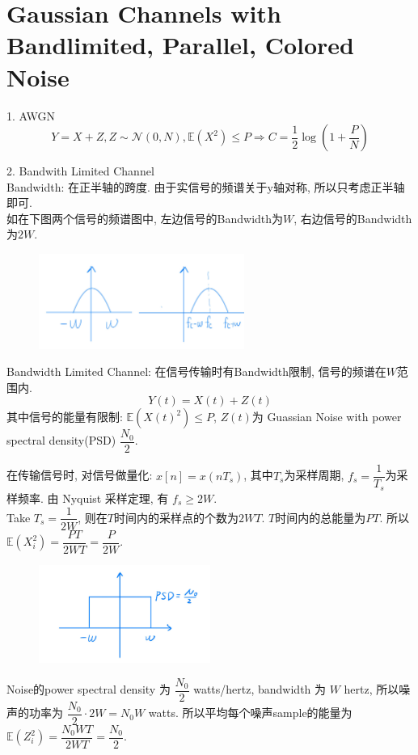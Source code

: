 \section{Gaussian Channels with Bandlimited, Parallel, Colored Noise}
1. AWGN
$$Y=X+Z, Z\sim\mathcal{N}(0,N), \mathbb{E}(X^2)\leq P\Rightarrow C=\dfrac{1}{2}\log\left(1+\dfrac{P}{N}\right)$$

2. Bandwith Limited Channel \\
Bandwidth: 在正半轴的跨度. 由于实信号的频谱关于y轴对称, 所以只考虑正半轴即可. \\
如在下图两个信号的频谱图中, 左边信号的Bandwidth为$W$, 右边信号的Bandwidth为$2W$.
\begin{figure}[htbp]
    \centering
    \includegraphics[width=0.6\textwidth]{./figures/chapter7/bandwidth.png}
\end{figure}

Bandwidth Limited Channel: 在信号传输时有Bandwidth限制, 信号的频谱在$W$范围内.
$$Y(t)=X(t)+Z(t)$$
其中信号的能量有限制: $\mathbb{E}(X(t)^2)\leq P$, $Z(t)$为 Guassian Noise with power spectral density(PSD) $\dfrac{N_0}{2}$.

在传输信号时, 对信号做量化: $x[n]=x(nT_s)$, 其中$T_s$为采样周期, $f_s=\dfrac{1}{T_s}$为采样频率. 由 Nyquist 采样定理, 有 $f_s\geq 2W$. \\
Take $T_s=\dfrac{1}{2W}$, 则在$T$时间内的采样点的个数为$2WT$. $T$时间内的总能量为$PT$. 所以 $\mathbb{E}(X_i^2)=\dfrac{PT}{2WT}=\dfrac{P}{2W}$.
\begin{figure}[htbp]
    \centering
    \includegraphics[width=0.5\textwidth]{./figures/chapter7/noise.png}
\end{figure}

Noise的power spectral density 为 $\dfrac{N_0}{2}$ watts/hertz, bandwidth 为 $W$ hertz, 所以噪声的功率为 $\dfrac{N_0}{2}\cdot 2W=N_0W$ watts. 所以平均每个噪声sample的能量为 $\mathbb{E}(Z_i^2)=\dfrac{N_0WT}{2WT}=\dfrac{N_0}{2}$.

